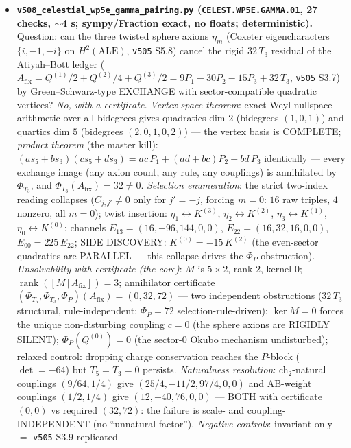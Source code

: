 \begin{itemize}[leftmargin=1.5em]
\item \textbf{\texttt{v508\_celestial\_wp5e\_gamma\_pairing.py} (\texttt{CELEST.WP5E.GAMMA.01}, 27
checks, $\sim$4 s; sympy/Fraction exact, no floats; deterministic).} Question: can the three
twisted sphere axions $\eta_m$ (Coxeter eigencharacters $\{i,-1,-i\}$ on $H^2(\mathrm{ALE})$,
\texttt{v505} S5.8) cancel the rigid $32\,T_3$ residual of the Atiyah--Bott ledger
($A_{\mathrm{fix}}=Q^{(1)}/2{+}Q^{(2)}/4{+}Q^{(3)}/2=9P_1{-}30P_2{-}15P_3{+}32\,T_3$,
\texttt{v505} S3.7) by Green--Schwarz-type EXCHANGE with sector-compatible quadratic vertices?
\emph{No, with a certificate.} \emph{Vertex-space theorem}: exact Weyl nullspace arithmetic over
all bidegrees gives quadratics dim $2$ (bidegrees $(1,0,1)$) and quartics dim $5$ (bidegrees
$(2,0,1,0,2)$) --- the vertex basis is COMPLETE; \emph{product theorem} (the master kill):
$(a s_5{+}b s_3)(c s_5{+}d s_3)=ac\,P_1{+}(ad{+}bc)P_2{+}bd\,P_3$ identically --- every exchange
image (any axion count, any rule, any couplings) is annihilated by $\Phi_{T_3}$, and
$\Phi_{T_3}(A_{\mathrm{fix}})=32\neq0$. \emph{Selection enumeration}: the strict two-index reading
collapses ($C_{j,j'}\neq0$ only for $j'=-j$, forcing $m=0$: $16$ raw triples, $4$ nonzero, all
$m=0$); twist insertion: $\eta_1{\leftrightarrow}K^{(3)}$, $\eta_2{\leftrightarrow}K^{(2)}$,
$\eta_3{\leftrightarrow}K^{(1)}$, $\eta_0{\leftrightarrow}K^{(0)}$; channels
$E_{13}=(16,-96,144,0,0)$, $E_{22}=(16,32,16,0,0)$, $E_{00}=225\,E_{22}$; SIDE DISCOVERY:
$K^{(0)}=-15\,K^{(2)}$ (the even-sector quadratics are PARALLEL --- this collapse drives the
$\Phi_P$ obstruction). \emph{Unsolvability with certificate (the core)}: $M$ is $5{\times}2$,
rank $2$, kernel $0$; $\operatorname{rank}([M\,|\,A_{\mathrm{fix}}])=3$; annihilator certificate
$(\Phi_{T_5},\Phi_{T_3},\Phi_P)(A_{\mathrm{fix}})=(0,32,72)$ --- two independent obstructions
($32\,T_3$ structural, rule-independent; $\Phi_P=72$ selection-rule-driven); $\ker M=0$ forces
the unique non-disturbing coupling $c=0$ (the sphere axions are RIGIDLY SILENT);
$\Phi_P(Q^{(0)})=0$ (the sector-$0$ Okubo mechanism undisturbed); relaxed control: dropping
charge conservation reaches the $P$-block ($\det=-64$) but $T_5=T_3=0$ persists.
\emph{Naturalness resolution}: ch$_2$-natural couplings $(9/64,1/4)$ give
$(25/4,-11/2,97/4,0,0)$ and AB-weight couplings $(1/2,1/4)$ give $(12,-40,76,0,0)$ --- BOTH with
certificate $(0,0)$ vs required $(32,72)$: the failure is scale- and coupling-INDEPENDENT (no
``unnatural factor''). \emph{Negative controls}: invariant-only $=$ \texttt{v505} S3.9 replicated

\end{itemize}
